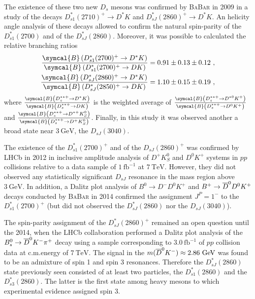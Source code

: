 The existence of these two new $D_s$ mesons was confirmed by \textsc{BaBar} in 2009 \cite{Aubert:2009ah} in a study of the decays $D^*_{s 1}(2710)^+ \to D^* K$ and $D^*_{s J}(2860)^+ \to D^* K$. An helicity angle analysis of these decays allowed to confirm the natural spin-parity of the $D^*_{s 1}(2700)$ and of the $D^*_{s J}(2860)$. Moreover, it was possible to calculated the relative branching ratios
\begin{subequations}
  \begin{align}
    \frac{\symcal{B} \left( D^*_{s 1}(2700)^+ \to D^* K \right)}{\symcal{B} \left(  D^*_{s 1}(2700)^+ \to D K \right)} &= 0.91 \pm 0.13 \pm 0.12 \ , \\
    \frac{\symcal{B} \left( D^*_{s J}(2860)^+ \to D^* K \right)}{\symcal{B} \left(  D^*_{s J}(2850)^+ \to D K \right)} &= 1.10 \pm 0.15 \pm 0.19 \ ,
  \end{align}
\end{subequations}
where $\frac{\symcal{B} \left( D^{* * +}_s \to D^* K \right)}{\symcal{B} \left( D^{* * +}_s \to D K \right)}$ is the weighted average of $\frac{\symcal{B} \left( D^{* * +}_s \to D^{* 0} K^+ \right)}{\symcal{B} \left( D^{* * +}_s \to D^0 K^+ \right)}$ and $\frac{\symcal{B} \left( D^{* * +}_s \to D^{* +} K^0_S \right)}{\symcal{B} \left( D^{* * +}_s \to D^+ K^0_S \right)}$. Finally, in this study it was observed another a broad state near $3 \ \text{GeV}$, the $D_{s J}(3040)$.

The existence of the $D^*_{s 1}(2700)^+$ and of the $D_{s J}(2860)^+$ was confirmed by LHCb in 2012 \cite{Aaij:2012pc} in inclusive amplitude analysis of $D^+ K^0_S$ and $D^0 K^+$ systems in $p p$ collisions relative to a data sample of $1 \ \text{fb}^{-1}$ at $7 \ \text{TeV}$. However, they did not observed any statistically significant $D_{s J}$ resonance in the mass region above $3 \ \text{GeV}$. In addition, a Dalitz plot analysis of $B^0 \to D^- D^0 K^+$ and $B^+ \to \overline{D}^0 D^0 K^+$ decays conducted by \textsc{BaBar} in 2014 \cite{Lees:2014abp} confirmed the assignment $J^P = 1^-$ to the $D^*_{s 1}(2700)^+$ (but did not observed the $D^*_{s J}(2860)$ nor the $D_{s J}(3040)$).

The spin-parity assignment of the $D^*_{s J}(2860)^+$ remained an open question until the 2014, when the LHCb collaboration performed a Dalitz plot analysis of the $B^0_s \to \overline{D}^0 K^- \pi^+$ decay \cite{Aaij:2014xza} using a sample corresponding to $3.0 \ \text{fb}^{-1}$ of $p p$  collision data at c.m.\@ energy of $7 \ \text{TeV}$. The signal in the $m(\overline{D}^0 K^-) \approx 2.86 \ \text{GeV}$ was found to be an admixture of spin 1 and spin 3 resonances. Therefore the $D^*_{s J} (2860)$ state previously seen consisted of at least two particles, the $D^*_{s 1}(2860)$ and the $D^*_{s 3}(2860)$. The latter is the first state among heavy mesons to which experimental evidence assigned spin 3.

